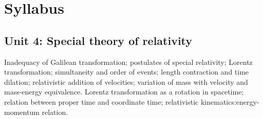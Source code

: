 \section*{Syllabus}

    \subsection*{Unit 4: Special theory of relativity}
        Inadequacy of Galilean transformation; postulates of special relativity; Lorentz transformation; simultaneity and order of events; length contraction and time dilation; relativistic addition of velocities; variation of mass with velocity and mass-energy equivalence. Lorentz transformation as a rotation in spacetime; relation between proper time and coordinate time; relativistic kinematics:energy-momentum relation.